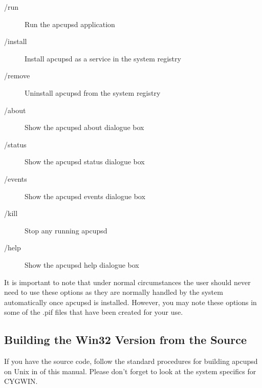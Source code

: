 {{{{{{{\begin{description}
\item [/run]
   Run the apcupsd application  

\item [/install]
   Install apcupsd as a service in the system registry  

\item [/remove]
   Uninstall apcupsd from the system registry  

\item [/about]
   Show the apcupsd about dialogue box  

\item [/status]
   Show the apcupsd status dialogue box  

\item [/events]
   Show the apcupsd events dialogue box  

\item [/kill]
   Stop any running apcupsd  

\item [/help]
   Show the apcupsd help dialogue box 
\end{description}

It is important to note that under normal circumstances the user should never
need to use these options as they are normally handled by the system
automatically once apcupsd is installed. However, you may note these options
in some of the .pif files that have been created for your use. 

\label{Building-the-Win32-Version-from-the-Source}

\subsection*{Building the Win32 Version from the Source}

\label{index-Windows_002c-Building-187}
\label{index-Building_002c-Windows-188}
If you have the source code, follow the standard procedures for building
apcupsd on Unix in 
 of this manual. Please
don't forget to look at the system specifics for CYGWIN. 

\label{Installation-on-Serial_002dLine-UPSes}

}}}}}}}
